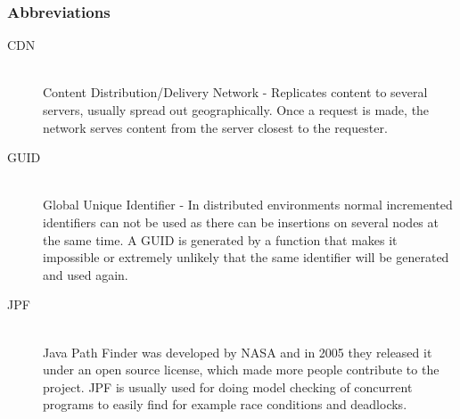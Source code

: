 \documentclass[a4paper,12pt]{article}
\begin{document}
\subsubsection{Abbreviations}
\begin{description}

\item[CDN] \hfill \\
Content Distribution/Delivery Network - Replicates content to several servers, usually spread out
geographically. Once a request is made, the network serves content from the server closest to the
requester.

\item[GUID] \hfill \\
Global Unique Identifier - In distributed environments normal incremented identifiers can
not be used as there can be insertions on several nodes at the same time. A GUID is generated by a
function that makes it impossible or extremely unlikely that the same identifier will be generated
and used again.

\item[JPF] \hfill \\
Java Path Finder was developed by NASA and in 2005 they released it under an open source
license, which made more people contribute to the project. JPF is usually used for doing model
checking of concurrent programs to easily find for example race conditions and deadlocks.

\end{description}
\end{document}
